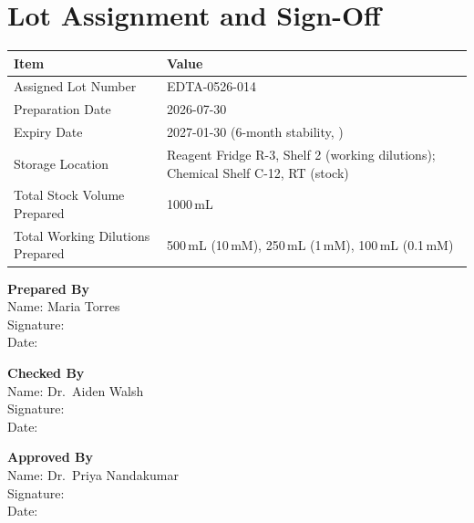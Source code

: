 \section{Lot Assignment and Sign-Off}
\label{sec:signoff}

\begin{tabularx}{\textwidth}{@{}lX@{}}
\toprule
\textbf{Item} & \textbf{Value} \\
\midrule
Assigned Lot Number & EDTA-0526-014 \\
\rowcolor{labteal!5}
Preparation Date & 2026-07-30 \\
Expiry Date & 2027-01-30 (6-month stability, \cite{meridian_tb}) \\
\rowcolor{labteal!5}
Storage Location & Reagent Fridge R-3, Shelf 2 (working dilutions); Chemical Shelf C-12, RT (stock) \\
Total Stock Volume Prepared & 1000\,mL \\
\rowcolor{labteal!5}
Total Working Dilutions Prepared & 500\,mL (10\,mM), 250\,mL (1\,mM), 100\,mL (0.1\,mM) \\
\bottomrule
\end{tabularx}

\vspace{10pt}
\noindent
\begin{minipage}[t]{0.31\textwidth}
\textbf{Prepared By}\\[2pt]
Name: Maria Torres\\[16pt]
Signature: \makebox[3.6cm]{\hrulefill}\\[10pt]
Date: \makebox[3.6cm]{\hrulefill}
\end{minipage}\hfill
\begin{minipage}[t]{0.31\textwidth}
\textbf{Checked By}\\[2pt]
Name: Dr.\ Aiden Walsh\\[16pt]
Signature: \makebox[3.6cm]{\hrulefill}\\[10pt]
Date: \makebox[3.6cm]{\hrulefill}
\end{minipage}\hfill
\begin{minipage}[t]{0.31\textwidth}
\textbf{Approved By}\\[2pt]
Name: Dr.\ Priya Nandakumar\\[16pt]
Signature: \makebox[3.6cm]{\hrulefill}\\[10pt]
Date: \makebox[3.6cm]{\hrulefill}
\end{minipage}
\par

\vspace{12pt}
\small


